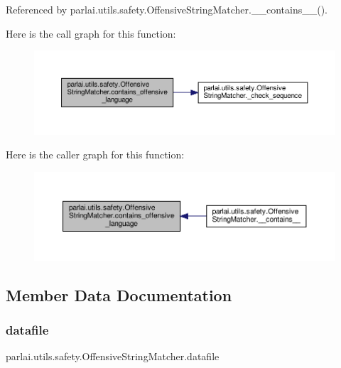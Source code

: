 Referenced by parlai.\+utils.\+safety.\+Offensive\+String\+Matcher.\+\_\+\+\_\+contains\+\_\+\+\_\+().

Here is the call graph for this function\+:
\nopagebreak
\begin{figure}[H]
\begin{center}
\leavevmode
\includegraphics[width=350pt]{classparlai_1_1utils_1_1safety_1_1OffensiveStringMatcher_a926609d00716d64848b3b98079bd1d30_cgraph}
\end{center}
\end{figure}
Here is the caller graph for this function\+:
\nopagebreak
\begin{figure}[H]
\begin{center}
\leavevmode
\includegraphics[width=350pt]{classparlai_1_1utils_1_1safety_1_1OffensiveStringMatcher_a926609d00716d64848b3b98079bd1d30_icgraph}
\end{center}
\end{figure}


\subsection{Member Data Documentation}
\mbox{\label{classparlai_1_1utils_1_1safety_1_1OffensiveStringMatcher_a47317e09499753db2a16fc36fd39de90}} 
\subsubsection{\texorpdfstring{datafile}{datafile}}
{\footnotesize\ttfamily parlai.\+utils.\+safety.\+Offensive\+String\+Matcher.\+datafile}



